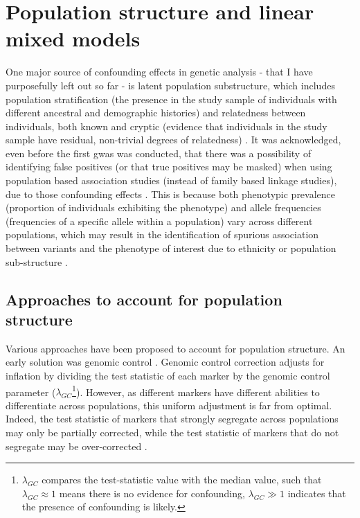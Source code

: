 
\section{Population structure and linear mixed models}
\label{sec:linear_mixed_models}

One major source of confounding effects in genetic analysis - that I have purposefully left out so far -  is latent population substructure, which includes population stratification (the presence in the study sample of individuals with different ancestral and demographic histories) and relatedness between individuals, both known and cryptic (evidence that individuals in the study sample have residual, non-trivial degrees of relatedness) \cite{mccarthy2008genome}.
It was acknowledged, even before the first \gls{gwas} was conducted, that there was a possibility of identifying false positives (or that true positives may be masked) when using population based association studies (instead of family based linkage studies), due to those confounding effects \cite{burton2005key}. 
This is because both phenotypic prevalence (proportion of individuals exhibiting the phenotype) and allele frequencies (frequencies of a specific allele within a population) vary across different populations, which may result in the identification of spurious association between variants and the phenotype of interest due to ethnicity or population sub-structure \cite{burton2005key}.


\subsection{Approaches to account for population structure}
\label{sec:pop_struct_noLMM}

Various approaches have been proposed to account for population structure.
An early solution was genomic control \cite{devlin1999genomic}.
Genomic control correction adjusts for inflation by dividing the test statistic of each marker by the genomic control parameter ($\lambda_{GC}$\footnote{$\lambda_{GC}$ compares the test-statistic value with the median value, such that $\lambda_{GC} \approx 1$ means there is no evidence for confounding, $\lambda_{GC} \gg 1$ indicates that the presence of confounding is likely.}). 
However, as different markers have different abilities to differentiate across populations, this uniform adjustment is far from optimal. 
Indeed, the test statistic of markers that strongly segregate across populations may only be partially corrected, while the test statistic of markers that do not segregate may be over-corrected \cite{marchini2004effects, price2006principal}.

